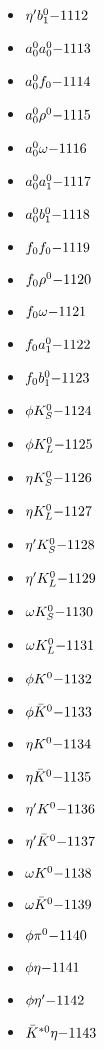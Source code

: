 \begin{multicols}{3}
\begin{itemize}
 \item $ {\eta^{\prime}} b_{1}^{0} \hfill{-1112}$
 \item $ a_{0}^{0} a_{0}^{0} \hfill{-1113}$
 \item $ a_{0}^{0} f_{0} \hfill{-1114}$
 \item $ a_{0}^{0} \rho^{0} \hfill{-1115}$
 \item $ a_{0}^{0} \omega \hfill{-1116}$
 \item $ a_{0}^{0} a_{1}^{0} \hfill{-1117}$
 \item $ a_{0}^{0} b_{1}^{0} \hfill{-1118}$
 \item $ f_{0} f_{0} \hfill{-1119}$
 \item $ f_{0} \rho^{0} \hfill{-1120}$
 \item $ f_{0} \omega \hfill{-1121}$
 \item $ f_{0} a_{1}^{0} \hfill{-1122}$
 \item $ f_{0} b_{1}^{0} \hfill{-1123}$
 \item $ \phi K_{S}^{0} \hfill{-1124}$
 \item $ \phi K_{L}^{0} \hfill{-1125}$
 \item $ \eta K_{S}^{0} \hfill{-1126}$
 \item $ \eta K_{L}^{0} \hfill{-1127}$
 \item $ {\eta^{\prime}} K_{S}^{0} \hfill{-1128}$
 \item $ {\eta^{\prime}} K_{L}^{0} \hfill{-1129}$
 \item $ \omega K_{S}^{0} \hfill{-1130}$
 \item $ \omega K_{L}^{0} \hfill{-1131}$
 \item $ \phi K^{0} \hfill{-1132}$
 \item $ \phi \bar{K}^{0} \hfill{-1133}$
 \item $ \eta K^{0} \hfill{-1134}$
 \item $ \eta \bar{K}^{0} \hfill{-1135}$
 \item $ {\eta^{\prime}} K^{0} \hfill{-1136}$
 \item $ {\eta^{\prime}} \bar{K}^{0} \hfill{-1137}$
 \item $ \omega K^{0} \hfill{-1138}$
 \item $ \omega \bar{K}^{0} \hfill{-1139}$
 \item $ \phi \pi^{0} \hfill{-1140}$
 \item $ \phi \eta \hfill{-1141}$
 \item $ \phi {\eta^{\prime}} \hfill{-1142}$
 \item $ \bar{K}^{*0} \eta \hfill{-1143}$

\end{itemize}
\end{multicols}
